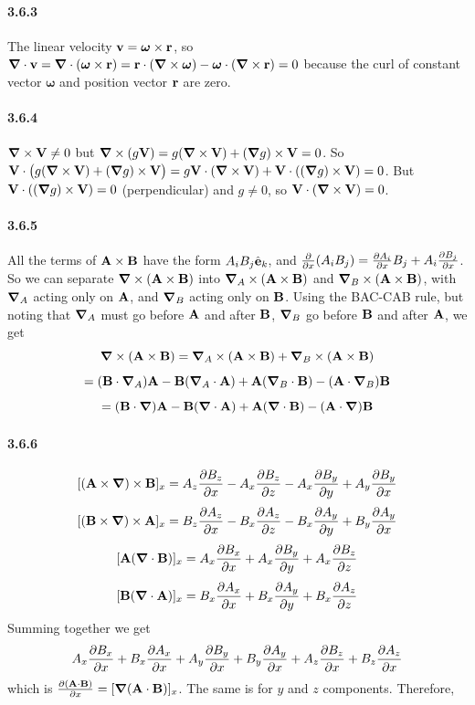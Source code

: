 \documentclass[a4paper]{article}
\begin{document}
\paragraph{3.6.3}
The linear velocity $\V{v}=\boldsymbol{\omega}\times\V{r}$, so $\del\cdot\V{v}=\del\cdot(\boldsymbol{\omega}\times\V{r})=\V{r}\cdot(\del\times\boldsymbol{\omega})-\boldsymbol{\omega}\cdot(\del\times\V{r})=0$ because the curl of constant vector $\boldsymbol{\omega}$ and position vector $\V{r}$ are zero. 

\paragraph{3.6.4}
$\del\times\V{V}\neq0$ but $\del\times(g\V{V})=g(\del\times\V{V})+(\del g)\times\V{V}=0$. So $\V{V}\cdot\big(g(\del\times\V{V})+(\del g)\times\V{V} \big)=g\V{V}\cdot(\del\times\V{V})+\V{V}\cdot((\del g)\times\V{V})=0$. But $\V{V}\cdot((\del g)\times\V{V})=0$ (perpendicular) and $g\neq 0$, so $\V{V}\cdot(\del\times\V{V})=0$.  

\paragraph{3.6.5}
All the terms of $\V{A}\times\V{B}$ have the form $A_iB_j\VE_k$, and $\pdv{}{x}(A_iB_j)=\pdv{A_i}{x}B_j+A_i\pdv{B_j}{x}$. So we can separate $\del\times(\V{A}\times\V{B})$ into $\del_A\times(\V{A}\times\V{B})$ and $\del_B\times(\V{A}\times\V{B})$, with $\del_A$ acting only on $\V{A}$, and $\del_B$ acting only on $\V{B}$. Using the BAC-CAB rule, but noting that $\del_A$ must go before $\V{A}$ and after $\V{B}$, $\del_B$ go before $\V{B}$ and after $\V{A}$, we get 
\[
\del\times(\V{A}\times\V{B})=\del_A\times(\V{A}\times\V{B})+\del_B\times(\V{A}\times\V{B})
\]
\[
=(\V{B}\cdot\del_A)\V{A}-\V{B}(\del_A\cdot\V{A})+\V{A}(\del_B\cdot\V{B})-(\V{A}\cdot\del_B)\V{B}
\]
\[
=(\V{B}\cdot\del)\V{A}-\V{B}(\del\cdot\V{A})+\V{A}(\del\cdot\V{B})-(\V{A}\cdot\del)\V{B}
\]

\paragraph{3.6.6}
\[[(\V{A}\times\del)\times\V{B}]_x=A_z\pdv{B_z}{x}-A_x\pdv{B_z}{z}-A_x\pdv{B_y}{y}+A_y\pdv{B_y}{x}
\]
\[[(\V{B}\times\del)\times\V{A}]_x=B_z\pdv{A_z}{x}-B_x\pdv{A_z}{z}-B_x\pdv{A_y}{y}+B_y\pdv{A_y}{x}
\]
\[
[\V{A}(\del\cdot\V{B})]_x=A_x\pdv{B_x}{x}+A_x\pdv{B_y}{y}+A_x\pdv{B_z}{z}
\]
\[
[\V{B}(\del\cdot\V{A})]_x=B_x\pdv{A_x}{x}+B_x\pdv{A_y}{y}+B_x\pdv{A_z}{z}
\]
Summing together we get 
\[
A_x\pdv{B_x}{x}+B_x\pdv{A_x}{x}+A_y\pdv{B_y}{x}+B_y\pdv{A_y}{x}+A_z\pdv{B_z}{x}+B_z\pdv{A_z}{x}
\]
which is $\pdv{(\V{A}\cdot\V{B})}{x}=[\del(\V{A}\cdot\V{B})]_x$. The same is for $y$ and $z$ components. Therefore,
\end{document}
